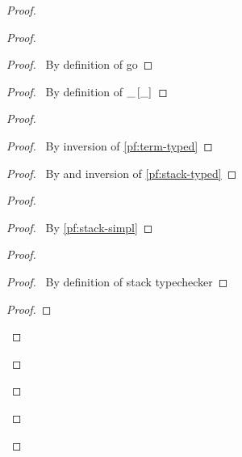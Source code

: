\documentclass[a4paper]{article}
\begin{document}
\begin{proof}
\begin{proof}
\begin{proof}
      \pf\ By definition of \textsf{go}
    \end{proof}
    \begin{proof}
      \pf\ By definition of $\_ \left[ \_ \right]$
    \end{proof}
    \begin{proof}
      \begin{proof}
        \pf\ By inversion of \ref{pf:term-typed}
      \end{proof}
      \begin{proof}
        \pf\ By  and inversion of \ref{pf:stack-typed}
      \end{proof}
      \begin{proof}
        \begin{proof}
          \pf\ By \ref{pf:stack-simpl}
        \end{proof}
        \begin{proof}
          \begin{proof}
            \pf\ By definition of stack typechecker
          \end{proof}
          \begin{proof}

\end{proof}
\end{proof}
\end{proof}
\end{proof}
\end{proof}
\end{proof}
\end{document}
